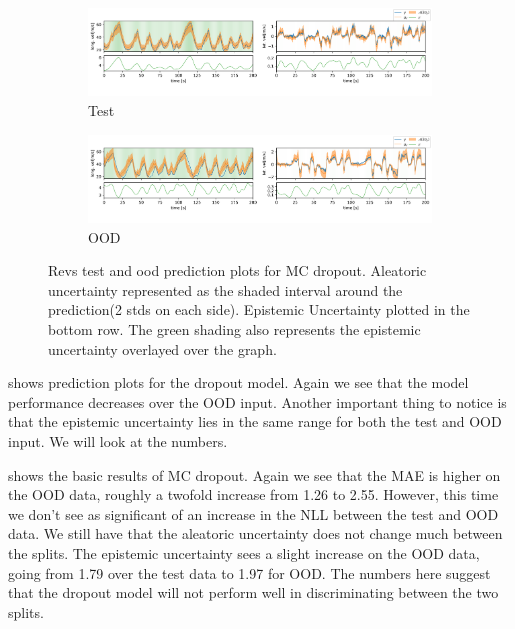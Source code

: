 \begin{figure}[htbp]
  \centering
  
  \begin{subfigure}[b]{\textwidth}
    \includegraphics[width=\textwidth]{Experiments/figs/revs_dropout_test.png}
    \caption{Test}
  \end{subfigure}
  
  \begin{subfigure}[b]{\textwidth}
    \includegraphics[width=\textwidth]{Experiments/figs/revs_dropout_ood.png}
    \caption{OOD}
  \end{subfigure}
  
  \caption{Revs test and ood prediction plots for MC dropout. Aleatoric uncertainty represented as the shaded interval around the prediction(2 stds on each side). Epistemic Uncertainty plotted in the bottom row. The green shading also represents the epistemic uncertainty overlayed over the graph.}
  \label{fig:revs_dropout_run}
\end{figure}

 shows prediction plots for the dropout model. Again we see that the model performance decreases over the OOD input. Another important thing to notice is that the epistemic uncertainty lies in the same range for both the test and OOD input. We will look at the numbers.

 shows the basic results of MC dropout. Again we see that the MAE is higher on the OOD data, roughly a twofold increase from 1.26 to 2.55. However, this time we don't see as significant of an increase in the NLL between the test and OOD data. 
We still have that the aleatoric uncertainty does not change much between the splits. The epistemic uncertainty sees a slight increase on the OOD data, going from 1.79 over the test data to 1.97 for OOD. The numbers here suggest that the dropout model will not perform well in discriminating between the two splits.


